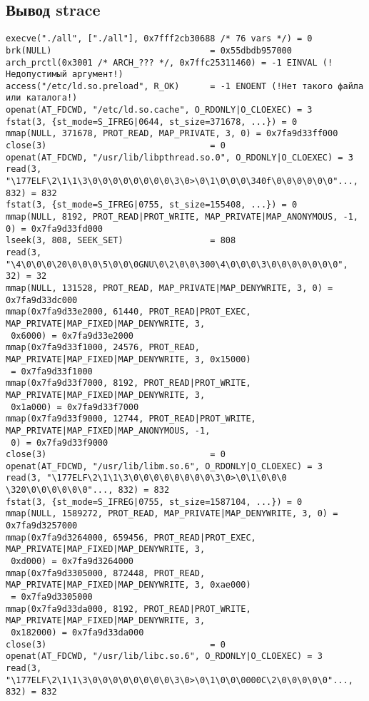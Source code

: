 \documentclass[12pt]{article}
\begin{document}
\subsection*{Вывод  strace}
{\scriptsize 
\begin{lstlisting}[escapechar=!]
execve("./all", ["./all"], 0x7fff2cb30688 /* 76 vars */) = 0
brk(NULL)                               = 0x55dbdb957000
arch_prctl(0x3001 /* ARCH_??? */, 0x7ffc25311460) = -1 EINVAL (!Недопустимый аргумент!)
access("/etc/ld.so.preload", R_OK)      = -1 ENOENT (!Нет такого файла или каталога!)
openat(AT_FDCWD, "/etc/ld.so.cache", O_RDONLY|O_CLOEXEC) = 3
fstat(3, {st_mode=S_IFREG|0644, st_size=371678, ...}) = 0
mmap(NULL, 371678, PROT_READ, MAP_PRIVATE, 3, 0) = 0x7fa9d33ff000
close(3)                                = 0
openat(AT_FDCWD, "/usr/lib/libpthread.so.0", O_RDONLY|O_CLOEXEC) = 3
read(3, "\177ELF\2\1\1\3\0\0\0\0\0\0\0\0\3\0>\0\1\0\0\0\340f\0\0\0\0\0\0"..., 832) = 832
fstat(3, {st_mode=S_IFREG|0755, st_size=155408, ...}) = 0
mmap(NULL, 8192, PROT_READ|PROT_WRITE, MAP_PRIVATE|MAP_ANONYMOUS, -1, 0) = 0x7fa9d33fd000
lseek(3, 808, SEEK_SET)                 = 808
read(3, "\4\0\0\0\20\0\0\0\5\0\0\0GNU\0\2\0\0\300\4\0\0\0\3\0\0\0\0\0\0\0", 32) = 32
mmap(NULL, 131528, PROT_READ, MAP_PRIVATE|MAP_DENYWRITE, 3, 0) = 0x7fa9d33dc000
mmap(0x7fa9d33e2000, 61440, PROT_READ|PROT_EXEC, MAP_PRIVATE|MAP_FIXED|MAP_DENYWRITE, 3,
 0x6000) = 0x7fa9d33e2000
mmap(0x7fa9d33f1000, 24576, PROT_READ, MAP_PRIVATE|MAP_FIXED|MAP_DENYWRITE, 3, 0x15000)
 = 0x7fa9d33f1000
mmap(0x7fa9d33f7000, 8192, PROT_READ|PROT_WRITE, MAP_PRIVATE|MAP_FIXED|MAP_DENYWRITE, 3,
 0x1a000) = 0x7fa9d33f7000
mmap(0x7fa9d33f9000, 12744, PROT_READ|PROT_WRITE, MAP_PRIVATE|MAP_FIXED|MAP_ANONYMOUS, -1,
 0) = 0x7fa9d33f9000
close(3)                                = 0
openat(AT_FDCWD, "/usr/lib/libm.so.6", O_RDONLY|O_CLOEXEC) = 3
read(3, "\177ELF\2\1\1\3\0\0\0\0\0\0\0\0\3\0>\0\1\0\0\0 \320\0\0\0\0\0\0"..., 832) = 832
fstat(3, {st_mode=S_IFREG|0755, st_size=1587104, ...}) = 0
mmap(NULL, 1589272, PROT_READ, MAP_PRIVATE|MAP_DENYWRITE, 3, 0) = 0x7fa9d3257000
mmap(0x7fa9d3264000, 659456, PROT_READ|PROT_EXEC, MAP_PRIVATE|MAP_FIXED|MAP_DENYWRITE, 3,
 0xd000) = 0x7fa9d3264000
mmap(0x7fa9d3305000, 872448, PROT_READ, MAP_PRIVATE|MAP_FIXED|MAP_DENYWRITE, 3, 0xae000)
 = 0x7fa9d3305000
mmap(0x7fa9d33da000, 8192, PROT_READ|PROT_WRITE, MAP_PRIVATE|MAP_FIXED|MAP_DENYWRITE, 3,
 0x182000) = 0x7fa9d33da000
close(3)                                = 0
openat(AT_FDCWD, "/usr/lib/libc.so.6", O_RDONLY|O_CLOEXEC) = 3
read(3, "\177ELF\2\1\1\3\0\0\0\0\0\0\0\0\3\0>\0\1\0\0\0000C\2\0\0\0\0\0"..., 832) = 832

\end{lstlisting}}
\end{document}
